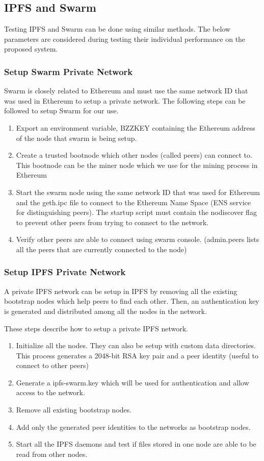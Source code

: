 \documentclass[11pt,openright]{report}
\begin{document}
\subsection{IPFS and Swarm}
Testing IPFS and Swarm can be done using similar methods. The below parameters are considered during testing their individual performance on the proposed system. 

\subsubsection{Setup Swarm Private Network}
Swarm is closely related to Ethereum and must use the same network ID that was used in Ethereum to setup a private network.
The following steps can be followed to setup Swarm for our use.
\begin{enumerate}
    \item Export an environment variable, BZZKEY containing the Ethereum address of the node that swarm is being setup.
    \item Create a trusted bootnode which other nodes (called peers) can connect to. This bootnode can be the miner node which we use for the mining process in Ethereum
    \item Start the swarm node using the same network ID that was used for Ethereum and the geth.ipc file to connect to the Ethereum Name Space (ENS service for distinguishing peers). The startup script must contain the nodiscover flag to prevent other peers from trying to connect to the network.
    \item Verify other peers are able to connect using swarm console. (admin.peers lists all the peers that are currently connected to the node)
\end{enumerate}

\subsubsection{Setup IPFS Private Network}
A private IPFS network can be setup in IPFS by removing all the existing bootstrap nodes which help peers to find each other. Then, an authentication key is generated and distributed among all the nodes in the network.

These steps describe how to setup a private IPFS network.
\begin{enumerate}
    \item Initialize all the nodes. They can also be setup with custom data directories. This process generates a 2048-bit RSA key pair and a peer identity (useful to connect to other peers)
    \item Generate a ipfs-swarm.key which will be used for authentication and allow access to the network.
    \item Remove all existing bootstrap nodes.
    \item Add only the generated peer identities to the networks as bootstrap nodes.
    \item Start all the IPFS daemons and test if files stored in one node are able to be read from other nodes.
\end{enumerate}
\end{document}
